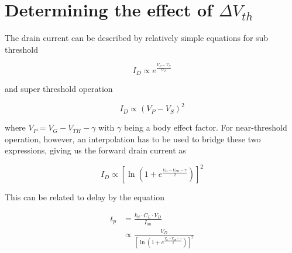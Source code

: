 \section{Determining the effect of $\Delta V_{th}$}
The drain current can be described by relatively simple equations for sub threshold \cite{Enz:1995vs} 

\begin{equation}
I_D \propto e^\frac{V_P-V_S}{U_T}
\end{equation}

and super threshold operation

\begin{equation}
I_D \propto (V_P-V_S)^2
\end{equation}

where $V_P=V_G-V_{TH}-\gamma$ with $\gamma$ being a body effect factor. For near-threshold operation, however, an interpolation has to be used to bridge these two expressions\cite{Enz:1995vs}, giving us the forward drain current as

\begin{equation}
I_D \propto \left[\ln\left(1+e^\frac{V_G-V_{TH}-\gamma}{2}\right)\right]^2
\end{equation}

This can be related to delay by the equation \cite{Hanson:2007uu}

\begin{align}
t_p &= \frac{k_d\cdot C_L\cdot V_D}{I_{on}}\\
&\propto\frac{V_D}{\left[\ln\left(1+e^\frac{V_G-V_{TH}-\gamma}{2}\right)\right]^2}
\end{align}
 
 
